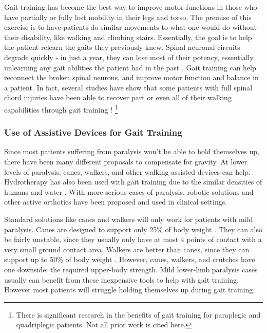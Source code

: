 Gait training has become the best way to improve motor functions in those who have partially or fully lost mobility in their legs and torso. The premise of this exercise is to have patients do similar movements to what one would do without their disability, like walking and climbing stairs. Essentially, the goal is to help the patient relearn the gaits they previously knew. Spinal neuronal circuits degrade quickly - in just a year, they can lose most of their potency, essentially unlearning any gait abilities the patient had in the past \cite{GaitTrainingClinical} \cite{RehabParaplegia} \cite{TrunkMuscleLoadingParaplegia}. Gait training can help reconnect the broken spinal neurons, and improve motor function and balance in a patient. In fact, several studies have show that some patients with full spinal chord injuries have been able to recover part or even all of their walking capabilities through gait training \cite{GaitTrainingClinical} \cite{ImprovingGaitAdaptabilityInPatients}! 
\footnote{There is significant research in the benefits of gait training for paraplegic and quadriplegic patients. Not all prior work is cited here.} 

\subsubsection{Use of Assistive Devices for Gait Training}
Since most patients suffering from paralysis won't be able to hold themselves up, there have been many different proposals to compensate for gravity. At lower levels of paralysis, canes, walkers, and other walking assisted devices can help. Hydrotherapy has also been used with gait training due to the similar densities of humans and water \cite{BenefitsOfHydrotherapy}. With more serious cases of paralysis, robotic solutions and other active orthotics have been proposed and used in clinical settings.

Standard solutions like canes and walkers will only work for patients with mild paralysis. Canes are designed to support only 25\% of body weight \cite{RehabParaplegia}. They can also be fairly unstable, since they usually only have at most 4 points of contact with a very small ground contact area. Walkers are better than canes, since they can support up to 50\% of body weight \cite{RehabParaplegia}. However, canes, walkers, and crutches have one downside: the required upper-body strength. Mild lower-limb paralysis cases usually can benefit from these inexpensive tools to help with gait training. However most patients will struggle holding themselves up during gait training.


